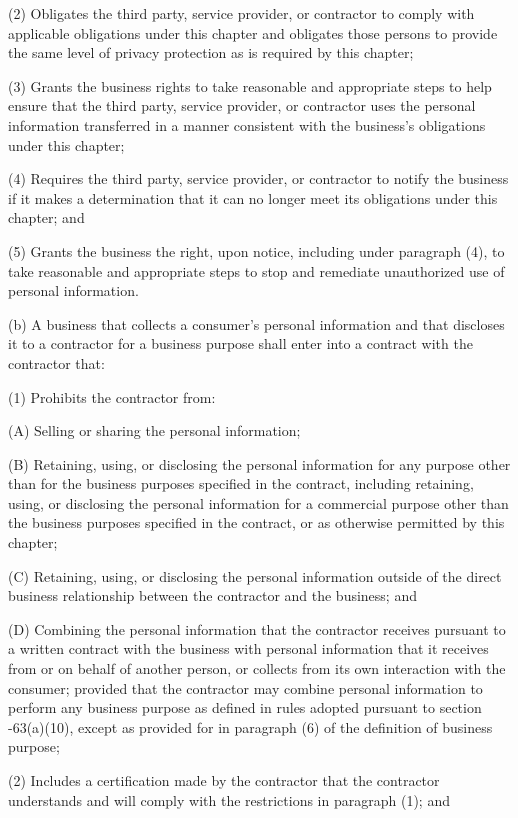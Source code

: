      (2)  Obligates the third party, service provider, or contractor to comply with applicable obligations under this chapter and obligates those persons to provide the same level of privacy protection as is required by this chapter;

     (3)  Grants the business rights to take reasonable and appropriate steps to help ensure that the third party, service provider, or contractor uses the personal information transferred in a manner consistent with the business's obligations under this chapter;

     (4)  Requires the third party, service provider, or contractor to notify the business if it makes a determination that it can no longer meet its obligations under this chapter; and

     (5)  Grants the business the right, upon notice, including under paragraph (4), to take reasonable and appropriate steps to stop and remediate unauthorized use of personal information.

     (b)  A business that collects a consumer's personal information and that discloses it to a contractor for a business purpose shall enter into a contract with the contractor that:

     (1)  Prohibits the contractor from:

          (A)  Selling or sharing the personal information;

          (B)  Retaining, using, or disclosing the personal information for any purpose other than for the business purposes specified in the contract, including retaining, using, or disclosing the personal information for a commercial purpose other than the business purposes specified in the contract, or as otherwise permitted by this chapter;

          (C)  Retaining, using, or disclosing the personal information outside of the direct business relationship between the contractor and the business; and

          (D)  Combining the personal information that the contractor receives pursuant to a written contract with the business with personal information that it receives from or on behalf of another person, or collects from its own interaction with the consumer; provided that the contractor may combine personal information to perform any business purpose as defined in rules adopted pursuant to section    -63(a)(10), except as provided for in paragraph (6) of the definition of business purpose;

     (2)  Includes a certification made by the contractor that the contractor understands and will comply with the restrictions in paragraph (1); and

